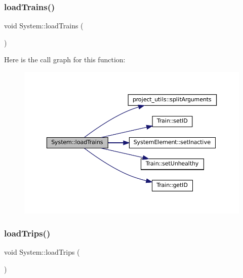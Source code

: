 \subsubsection{\texorpdfstring{load\+Trains()}{loadTrains()}}
{\footnotesize\ttfamily void System\+::load\+Trains (\begin{DoxyParamCaption}{ }\end{DoxyParamCaption})}

Here is the call graph for this function\+:
\nopagebreak
\begin{figure}[H]
\begin{center}
\leavevmode
\includegraphics[width=350pt]{classSystem_a5c7631890b3099bf2c6d9ff10e25513b_cgraph}
\end{center}
\end{figure}
\mbox{\label{classSystem_a437952e6a2cde86e17a747c0e5500d2b}} 
\subsubsection{\texorpdfstring{load\+Trips()}{loadTrips()}}
{\footnotesize\ttfamily void System\+::load\+Trips (\begin{DoxyParamCaption}{ }\end{DoxyParamCaption})}

